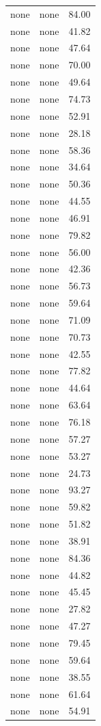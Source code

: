 \begin{tabular}{rrr}
none & none & 84.00 \\
none & none & 41.82 \\
none & none & 47.64 \\
none & none & 70.00 \\
none & none & 49.64 \\
none & none & 74.73 \\
none & none & 52.91 \\
none & none & 28.18 \\
none & none & 58.36 \\
none & none & 34.64 \\
none & none & 50.36 \\
none & none & 44.55 \\
none & none & 46.91 \\
none & none & 79.82 \\
none & none & 56.00 \\
none & none & 42.36 \\
none & none & 56.73 \\
none & none & 59.64 \\
none & none & 71.09 \\
none & none & 70.73 \\
none & none & 42.55 \\
none & none & 77.82 \\
none & none & 44.64 \\
none & none & 63.64 \\
none & none & 76.18 \\
none & none & 57.27 \\
none & none & 53.27 \\
none & none & 24.73 \\
none & none & 93.27 \\
none & none & 59.82 \\
none & none & 51.82 \\
none & none & 38.91 \\
none & none & 84.36 \\
none & none & 44.82 \\
none & none & 45.45 \\
none & none & 27.82 \\
none & none & 47.27 \\
none & none & 79.45 \\
none & none & 59.64 \\
none & none & 38.55 \\
none & none & 61.64 \\
none & none & 54.91 \\

\end{tabular}
